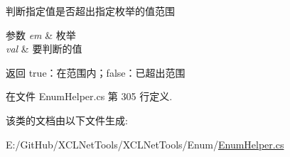 判断指定值是否超出指定枚举的值范围 


\begin{DoxyParams}{参数}
{\em em} & 枚举\\
\hline
{\em val} & 要判断的值\\
\hline
\end{DoxyParams}
\begin{DoxyReturn}{返回}
true：在范围内；false：已超出范围
\end{DoxyReturn}


在文件 Enum\+Helper.\+cs 第 305 行定义.



该类的文档由以下文件生成\+:\begin{DoxyCompactItemize}
\item 
E\+:/\+Git\+Hub/\+X\+C\+L\+Net\+Tools/\+X\+C\+L\+Net\+Tools/\+Enum/\hyperlink{_enum_helper_8cs}{Enum\+Helper.\+cs}\end{DoxyCompactItemize}

